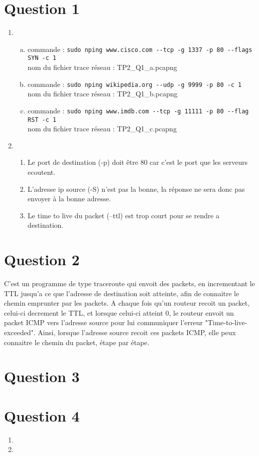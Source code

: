 
\section{Question 1}
\begin{enumerate}
	\item 
	\begin{enumerate}[a)]
		\item 
			commande : \verb!sudo nping www.cisco.com --tcp -g 1337 -p 80 --flags SYN -c 1!\\
			nom du fichier trace réseau : TP2\_Q1\_a.pcapng
		\item 
			commande : \verb!sudo nping wikipedia.org --udp -g 9999 -p 80 -c 1!\\
			nom du fichier trace réseau : TP2\_Q1\_b.pcapng
		\item 
			commande : \verb!sudo nping www.imdb.com --tcp -g 11111 -p 80 --flag RST -c 1!\\
			nom du fichier trace réseau : TP2\_Q1\_c.pcapng
	\end{enumerate}
	\item 
		\begin{enumerate}
			\item
				Le port de destination (-p) doit être 80 
				car c'est le port que les serveurs ecoutent.
			\item
				L'adresse ip source (-S) n'est pas la bonne,
				la réponse ne sera donc pas envoyer à la bonne
				adresse.
			\item
				Le time to live du packet (--ttl) est trop court
				pour se rendre a destination.
		\end{enumerate}
\end{enumerate}

\section{Question 2}
C'est un programme de type traceroute qui envoit des packets, 
en incrementant le TTL jusqu'a ce que l'adresse de destination soit 
atteinte, afin de connaitre le chemin emprunter par les packets. 
A chaque fois qu'un routeur recoit un packet, 
celui-ci decrement le TTL, et lorsque celui-ci atteint 0,
le routeur envoit un packet ICMP vers l'adresse source pour lui
communiquer l'erreur "Time-to-live-exceeded". Ainsi, lorsque 
l'adresse source recoit ces packets ICMP, 
elle peux connaitre le chemin du packet, étape par étape.

\section{Question 3}

\section{Question 4}
\begin{enumerate}
	\item 
	\item 
\end{enumerate}

